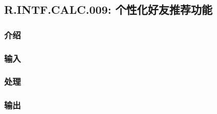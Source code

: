\subsection{R.INTF.CALC.009: 个性化好友推荐功能}
\subsubsection{介绍}
\subsubsection{输入}
\subsubsection{处理}
\subsubsection{输出}